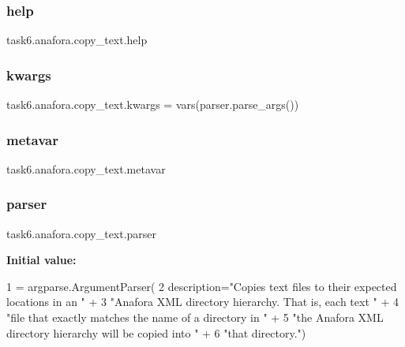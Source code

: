 \subsubsection{\texorpdfstring{help}{help}}
{\footnotesize\ttfamily task6.\+anafora.\+copy\+\_\+text.\+help}

\mbox{\label{namespacetask6_1_1anafora_1_1copy__text_a99296eafbdc1b4f5030af611d48bdd7a}} 
\subsubsection{\texorpdfstring{kwargs}{kwargs}}
{\footnotesize\ttfamily task6.\+anafora.\+copy\+\_\+text.\+kwargs = vars(parser.\+parse\+\_\+args())}

\mbox{\label{namespacetask6_1_1anafora_1_1copy__text_a974d87fb378f0e5377013c2e726d7e12}} 
\subsubsection{\texorpdfstring{metavar}{metavar}}
{\footnotesize\ttfamily task6.\+anafora.\+copy\+\_\+text.\+metavar}

\mbox{\label{namespacetask6_1_1anafora_1_1copy__text_ab22165cbcec04821811f8b64e35456e9}} 
\subsubsection{\texorpdfstring{parser}{parser}}
{\footnotesize\ttfamily task6.\+anafora.\+copy\+\_\+text.\+parser}

{\bfseries Initial value\+:}
\begin{DoxyCode}
1 =  argparse.ArgumentParser(
2         description=\textcolor{stringliteral}{"Copies text files to their expected locations in an "} +
3                     \textcolor{stringliteral}{"Anafora XML directory hierarchy. That is, each text "} +
4                     \textcolor{stringliteral}{"file that exactly matches the name of a directory in "} +
5                     \textcolor{stringliteral}{"the Anafora XML directory hierarchy will be copied into "} +
6                     \textcolor{stringliteral}{"that directory."})
\end{DoxyCode}
